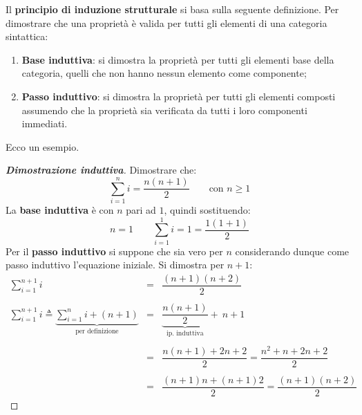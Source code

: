 \documentclass[a4paper]{article}
\begin{document}
	\noindent
	Il \textcolor{Red3}{\textbf{principio di induzione strutturale}} si basa sulla seguente definizione. Per dimostrare che una proprietà è valida per tutti gli elementi di una categoria sintattica:
	\begin{enumerate}
		\item \textbf{Base induttiva}: si dimostra la proprietà per tutti gli elementi base della categoria, quelli che non hanno nessun elemento come componente;
		\item \textbf{Passo induttivo}: si dimostra la proprietà per tutti gli elementi composti assumendo che la proprietà sia verificata da tutti i loro componenti immediati.
	\end{enumerate}
	Ecco un esempio.
	\begin{proof}[\textbf{Dimostrazione induttiva}]
		Dimostrare che:
		\begin{equation*}
			\sum_{i = 1}^{n} i = \dfrac{n \left( n + 1 \right)}{2} \hspace{2em} \text{con } n \ge 1
		\end{equation*}
		La \textbf{base induttiva} è con $n$ pari ad $1$, quindi sostituendo:
		\begin{equation*}
			n = 1 \hspace{2em} \sum_{i = 1}^{1} i = 1 = \dfrac{1 \left( 1 + 1 \right)}{2}
		\end{equation*}
		Per il \textbf{passo induttivo} si suppone che sia vero per $n$ considerando dunque come passo induttivo l'equazione iniziale. Si dimostra per $n + 1$:
		\begin{equation*}
			\begin{array}{rll}
				\displaystyle\sum_{i=1}^{n+1} i & = & \dfrac{ \left(n+1\right) \left(n+2\right) }{2} \\
				\\
				\displaystyle\sum_{i=1}^{n+1} i \triangleq \underbrace{\sum_{i=1}^{n} i + \left(n+1\right)}_{\text{per definizione}} & = & \underbrace{\dfrac{n \left(n+1\right)}{2}}_{\text{ip. induttiva}} + \: n + 1 \\
				\\
				& = & \dfrac{n \left(n+1\right) + 2n + 2}{2} = \dfrac{n^{2} + n + 2n + 2}{2} \\
				\\
				& = & \dfrac{\left(n+1\right) n + \left(n+1\right) 2}{2} = \dfrac{\left(n+1\right) \left(n+2\right)}{2}
			\end{array}
		\end{equation*}
	\end{proof}\newpage
\end{document}
